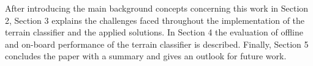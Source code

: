 After introducing the main background concepts concerning this work in Section 2, Section 3 explains the challenges faced throughout the implementation of the terrain classifier and the applied solutions. In Section 4 the evaluation of offline and on-board performance of the terrain classifier is described. Finally, Section 5 concludes the paper with a summary and gives an outlook for future work.
